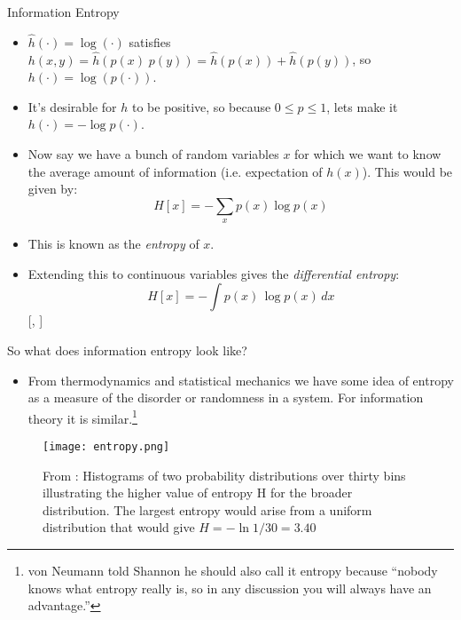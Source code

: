 \documentclass{beamer}
\begin{document}
\begin{frame}{Information Entropy}
\begin{itemize}
\item $\hat{h}(\cdot ) = \log ( \cdot )$ satisfies $h(x,y) = \hat{h}(p(x)\; p(y)) = \hat{h}(p(x)) + \hat{h}(p(y))$, so $h(\cdot ) = \log(p(\cdot ))$.
\item It's desirable for $h$ to be positive, so because $0 \leq p \leq 1$, lets make it $h(\cdot ) = -\log p(\cdot )$.
\item Now say we have a bunch of random variables $x$ for which we want to know the average amount of information (i.e. expectation of $h(x)$). This would be given by:
  \[H[x] = - \sum_x p(x) \log p(x) \]
\item This is known as the \textit{entropy} of $x$.
\item Extending this to continuous variables gives the \textit{differential entropy}:
  \[H[x] = - \int p(x)\, \log p(x)\, dx\][\cite{bishop}, \cite{shannon1948}]
\end{itemize}
\end{frame}

\begin{frame}{So what does information entropy look like?}
\begin{itemize}
\item From thermodynamics and statistical mechanics we have some idea of entropy as a measure of the disorder or randomness in a system. For information theory it is similar.\footnote{von Neumann told Shannon he should also call it entropy because ``nobody knows what entropy really is, so in any discussion you will always have an advantage.''}
\end{itemize}

\begin{figure}
\texttt{[image: entropy.png]}
\caption{\label{fig:entropy}From \cite{bishop}: Histograms of two probability distributions over thirty bins illustrating the higher value of entropy H for the broader distribution. The largest entropy would arise from a uniform distribution that would give $H = -\ln 1/30 = 3.40$}
\end{figure}

\end{frame}
\end{document}
